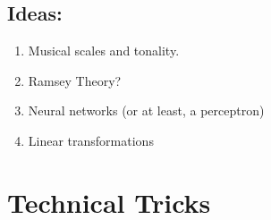 \documentclass[11pt]{article}
\theoremstyle{definition}
\begin{document}
\subsection{Ideas:}

\begin{enumerate}
\item Musical scales and tonality.
\item Ramsey Theory?
\item Neural networks (or at least, a perceptron)
\item Linear transformations
\end{enumerate}


\section{Technical Tricks}
\end{document}
